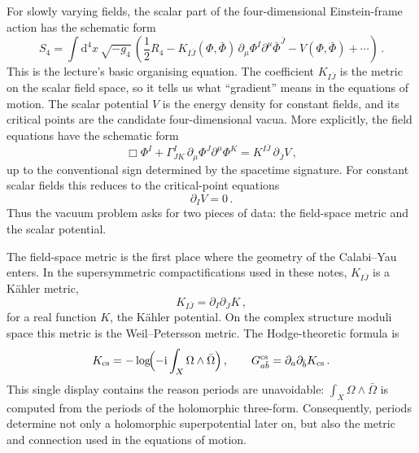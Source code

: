 For slowly varying fields, the scalar part of the four-dimensional
Einstein-frame action has the schematic form
\begin{equation}\label{eq:L2-schematic-4d-action}
    S_4
    =
    \int \mathrm{d}^4x\,\sqrt{-g_4}\,
    \left(
        \frac12 R_4
        -K_{I\bar J}(\Phi,\bar\Phi)\,
          \partial_\mu\Phi^I\partial^\mu\bar\Phi^{\bar J}
        -V(\Phi,\bar\Phi)
        +\cdots
    \right)\, .
\end{equation}
This is the lecture's basic organising equation.  The coefficient
$K_{I\bar J}$ is the metric on the scalar field space, so it tells us
what ``gradient'' means in the equations of motion.  The scalar
potential $V$ is the energy density for constant fields, and its
critical points are the candidate four-dimensional vacua.
More explicitly, the field equations have the schematic form
\begin{equation}\label{eq:L2-scalar-EOM-schematic}
    \Box\Phi^I
    +\Gamma^{I}_{JK}\,\partial_\mu\Phi^J\partial^\mu\Phi^K
    =
    K^{I\bar J}\,\partial_{\bar J}V\, ,
\end{equation}
up to the conventional sign determined by the spacetime signature.
For constant scalar fields this reduces to the critical-point equations
\begin{equation}\label{eq:L2-critical-point-equations}
    \partial_I V=0\, .
\end{equation}
Thus the vacuum problem asks for two pieces of data: the field-space
metric and the scalar potential.

The field-space metric is the first place where the geometry of the
Calabi--Yau enters.  In the supersymmetric compactifications used in
these notes, $K_{I\bar J}$ is a K\"ahler metric,
\begin{equation}\label{eq:L2-Kahler-metric}
    K_{I\bar J}
    =
    \partial_I\partial_{\bar J}K\, ,
\end{equation}
for a real function $K$, the K\"ahler potential.  On the complex
structure moduli space this metric is the Weil--Petersson metric.
The Hodge-theoretic formula is
\begin{equation}\label{eq:L2-Kcs-intro}
    K_{\rm cs}
    =
    -\log\!\Bigl(-\mathrm{i}\int_X\Omega\wedge\bar\Omega\Bigr)\, ,
    \qquad
    G^{\rm cs}_{a\bar b}
    =
    \partial_a\partial_{\bar b}K_{\rm cs}\, .
\end{equation}
This single display contains the reason periods are unavoidable:
$\int_X\Omega\wedge\bar\Omega$ is computed from the periods of the
holomorphic three-form.  Consequently, periods determine not only a
holomorphic superpotential later on, but also the metric and
connection used in the equations of motion.

